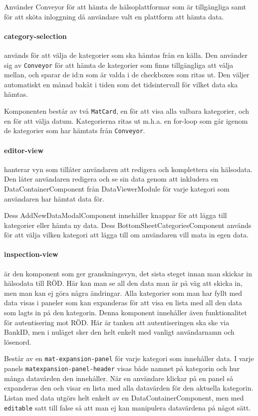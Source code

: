 \documentclass[techdoc/techdock.tex]{subfiles}
\begin{document}
Använder Conveyor för att hämta de hälsoplattformar som är tillgängliga samt
för att sköta inloggning då användare valt en plattform att hämta data.

\paragraph{category-selection} används för att välja de kategorier som ska
hämtas från en källa. Den använder sig av \texttt{Conveyor} för att hämta de
kategorier som finns tillgängliga att välja mellan, och sparar de id:n som är
valda i de checkboxes som ritas ut. Den väljer automatiskt en månad bakåt i
tiden som det tidsintervall för vilket data ska hämtas.

Komponenten består av två \texttt{MatCard}, en för att visa alla
valbara kategorier, och en för att välja datum. Kategorierna ritas ut m.h.a.
en for-loop som går igenom de kategorier som har hämtats från \texttt{Conveyor}.

\paragraph{editor-view}
hanterar vyn som tillåter användaren att redigera och komplettera sin
hälsodata. Den låter användaren redigera och se sin data genom att inkludera en
DataContainerComponent från DataViewerModule för varje kategori som användaren
har hämtat data för.

Dess AddNewDataModalComponent innehåller knappar för att lägga till kategorier
eller hämta ny data. Dess BottomSheetCategoriesComponent används för att välja
vilken kategori att lägga till om användaren vill mata in egen data.

\paragraph{inspection-view} är den komponent som ger granskningsvyn, det sista
steget innan man skickar in hälsodata till RÖD. Här kan man se all den data man
är på väg att skicka in, men man kan ej göra några ändringar. Alla kategorier
som man har fyllt med data visas i paneler som kan expanderas för att visa en
lista med all den data som lagts in på den kategorin. Denna komponent
innehåller även funktionalitet för autentisering mot RÖD. Här är tanken att
autentiseringen ska ske via BankID, men i nuläget sker den helt enkelt med
vanligt användarnamn och lösenord.

Består av en \texttt{mat-expansion-panel} för varje kategori som innehåller
data. I varje panels \texttt{mat\-expansion-panel-header} visas både namnet på
kategorin och hur många datavärden den innehåller. När en användare klickar på
en panel så expanderas den och visar en lista med alla datavärden för den
aktuella kategorin. Listan med data utgörs helt enkelt av en
DataContainerComponent, men med \texttt{editable} satt till false så att man ej
kan manipulera datavärdena på något sätt.
\end{document}
